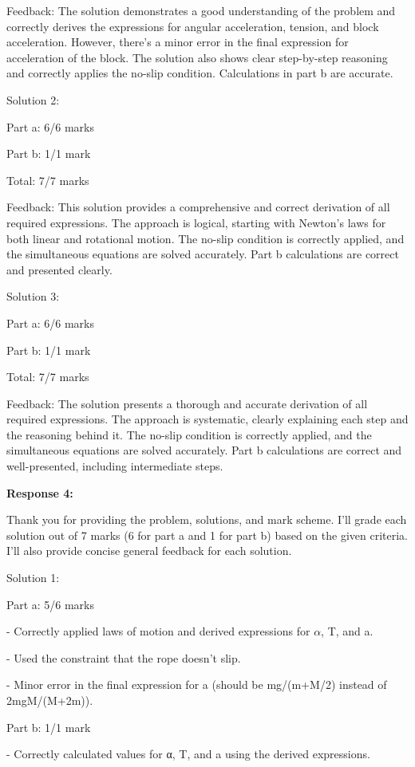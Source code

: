 \documentclass[a4paper,11pt]{article}
\begin{document}
Feedback: The solution demonstrates a good understanding of the problem and correctly derives the expressions for angular acceleration, tension, and block acceleration. However, there's a minor error in the final expression for acceleration of the block. The solution also shows clear step-by-step reasoning and correctly applies the no-slip condition. Calculations in part b are accurate.

Solution 2:

Part a: 6/6 marks

Part b: 1/1 mark

Total: 7/7 marks

Feedback: This solution provides a comprehensive and correct derivation of all required expressions. The approach is logical, starting with Newton's laws for both linear and rotational motion. The no-slip condition is correctly applied, and the simultaneous equations are solved accurately. Part b calculations are correct and presented clearly.

Solution 3:

Part a: 6/6 marks

Part b: 1/1 mark

Total: 7/7 marks

Feedback: The solution presents a thorough and accurate derivation of all required expressions. The approach is systematic, clearly explaining each step and the reasoning behind it. The no-slip condition is correctly applied, and the simultaneous equations are solved accurately. Part b calculations are correct and well-presented, including intermediate steps.

\bigskip
\textbf{Response 4:}

Thank you for providing the problem, solutions, and mark scheme. I'll grade each solution out of 7 marks (6 for part a and 1 for part b) based on the given criteria. I'll also provide concise general feedback for each solution.

Solution 1:

Part a: 5/6 marks

- Correctly applied laws of motion and derived expressions for \(\alpha\), T, and a.

- Used the constraint that the rope doesn't slip.

- Minor error in the final expression for a (should be mg/(m+M/2) instead of 2mgM/(M+2m)).

Part b: 1/1 mark

- Correctly calculated values for α, T, and a using the derived expressions.
\end{document}
